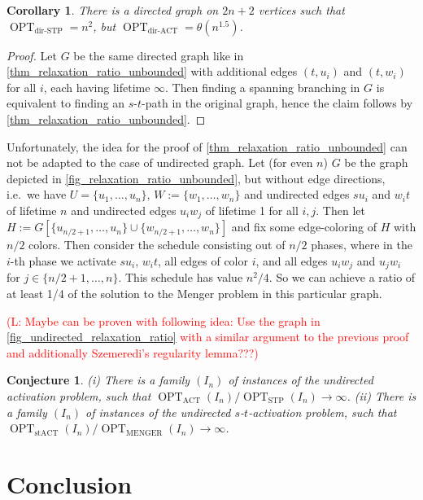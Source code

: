 \documentclass[10pt,a4paper]{article}
\newtheorem{corollary}[theorem]{Corollary}
\newtheorem{conjecture}[theorem]{Conjecture}
\numberwithin{equation}{section}
\newcommand{\set}[1]{\{ #1 \}}
\newcommand{\fromto}[2]{\set{#1, \ldots, #2}}
\newcommand{\comment}[1]{\textcolor{red}{(L: #1)}}
\DeclareMathOperator{\opt}{OPT}
\newcommand{\optAct}{\opt_\text{ACT}}
\newcommand{\optStAct}{\opt_\text{stACT}}
\newcommand{\optMenger}{\opt_\text{MENGER}}
\newcommand{\optSTP}{\opt_\text{STP}}
\newcommand{\optDirAct}{\opt_\text{dir-ACT}}
\newcommand{\optDirSTP}{\opt_\text{dir-STP}}
\begin{document}
\begin{corollary}
There is a directed graph on $2n+2$ vertices such that $\optDirSTP = n^2$, but $\optDirAct = \theta(n^{1.5})$.
\end{corollary}
\begin{proof}
Let $G$ be the same directed graph like in \cref{thm_relaxation_ratio_unbounded} with additional edges $(t, u_i)$ and $(t, w_i)$ for all $i$, each having lifetime $\infty$. Then finding a spanning branching in $G$ is equivalent to finding an $s$-$t$-path in the original graph, hence the claim follows by \cref{thm_relaxation_ratio_unbounded}.
\end{proof}

Unfortunately, the idea for the proof of \cref{thm_relaxation_ratio_unbounded} can not be adapted to the case of undirected graph. Let (for even $n$) $G$ be the graph depicted in \cref{fig_relaxation_ratio_unbounded}, but without edge directions, i.e.\ we have $U = \fromto{u_1}{u_n}$, $W := \fromto{w_1}{w_n}$ and undirected edges $su_i$ and $w_it$ of lifetime $n$ and undirected edges $u_iw_j$ of lifetime 1 for all $i, j$. Then let $H := G[\fromto{u_{n/2+1}}{u_n} \cup \fromto{w_{n/2+1}}{w_n}]$ and fix some edge-coloring of $H$ with $n/2$ colors. Then consider the schedule consisting out of $n/2$ phases, where in the $i$-th phase we activate $su_i$, $w_it$, all edges of color $i$, and all edges $u_iw_j$ and $u_jw_i$ for $j \in \fromto{n/2+1}{n}$. This schedule has value $n^2/4$. So we can achieve a ratio of at least 1/4 of the solution to the Menger problem in this particular graph.

\comment{Maybe can be proven with following idea: Use the graph in \cref{fig_undirected_relaxation_ratio} with a similar argument to the previous proof and additionally Szemeredi's regularity lemma???}

\begin{conjecture}
(i) There is a family $(I_n)$ of instances of the undirected activation problem, such that $\optAct(I_n) / \optSTP(I_n) \rightarrow \infty$. (ii) There is a family $(I_n)$ of instances of the undirected $s$-$t$-activation problem, such that $\optStAct(I_n) / \optMenger(I_n) \rightarrow \infty$.
\end{conjecture}

\section{Conclusion}
\end{document}
